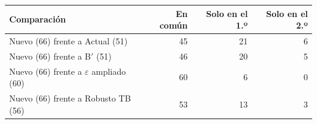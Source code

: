 \begin{tabular}{@{}lrrr@{}}
\toprule
Comparación & En común & Solo en el 1.º & Solo en el 2.º \\
\midrule
Nuevo (66) frente a Actual (51) & 45 & 21 & 6 \\
Nuevo (66) frente a B$'$ (51) & 46 & 20 & 5 \\
Nuevo (66) frente a $\varepsilon$ ampliado (60) & 60 & 6 & 0 \\
Nuevo (66) frente a Robusto TB (56) & 53 & 13 & 3 \\
\bottomrule
\end{tabular}
